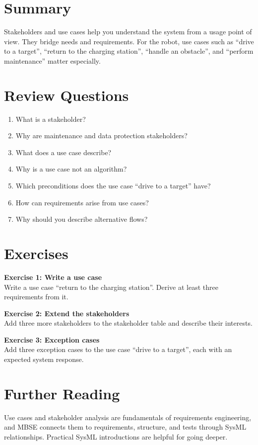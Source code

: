 \section{Summary}
Stakeholders and use cases help you understand the system from a usage point of view. They bridge needs and requirements. For the robot, use cases such as \enquote{drive to a target}, \enquote{return to the charging station}, \enquote{handle an obstacle}, and \enquote{perform maintenance} matter especially.

\section{Review Questions}
\begin{enumerate}
    \item What is a stakeholder?
    \item Why are maintenance and data protection stakeholders?
    \item What does a use case describe?
    \item Why is a use case not an algorithm?
    \item Which preconditions does the use case \enquote{drive to a target} have?
    \item How can requirements arise from use cases?
    \item Why should you describe alternative flows?
\end{enumerate}

\section{Exercises}
\begin{uebungbox}
\textbf{Exercise 1: Write a use case}\\
Write a use case \enquote{return to the charging station}. Derive at least three requirements from it.
\end{uebungbox}

\begin{uebungbox}
\textbf{Exercise 2: Extend the stakeholders}\\
Add three more stakeholders to the stakeholder table and describe their interests.
\end{uebungbox}

\begin{uebungbox}
\textbf{Exercise 3: Exception cases}\\
Add three exception cases to the use case \enquote{drive to a target}, each with an expected system response.
\end{uebungbox}

\section{Further Reading}
Use cases and stakeholder analysis are fundamentals of requirements engineering, and MBSE connects them to requirements, structure, and tests through SysML relationships. Practical SysML introductions \cite{delligatti2014,friedenthal2014} are helpful for going deeper.
